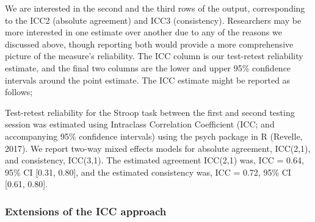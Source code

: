 \documentclass[english,,man,floatsintext]{apa6}
\begin{document}
We are interested in the second and the third rows of the output, corresponding to the ICC2 (absolute agreement) and ICC3 (consistency). Researchers may be more interested in one estimate over another due to any of the reasons we discussed above, though reporting both would provide a more comprehensive picture of the measure's reliability. The ICC column is our test-retest reliability estimate, and the final two columns are the lower and upper 95\% confidence intervals around the point estimate. The ICC estimate might be reported as follows;

Test-retest reliability for the Stroop task between the first and second testing session was estimated using Intraclass Correlation Coefficient (ICC; and accompanying 95\% confidence intervals) using the psych package in R (Revelle, 2017). We report two-way mixed effects models for absolute agreement, ICC(2,1), and consistency, ICC(3,1). The estimated agreement ICC(2,1) was, ICC = 0.64, 95\% CI {[}0.31, 0.80{]}, and the estimated consistency was, ICC = 0.72, 95\% CI {[}0.61, 0.80{]}.

\hypertarget{extensions-of-the-icc-approach}{%
\subsubsection{Extensions of the ICC approach}\label{extensions-of-the-icc-approach}}
\end{document}
